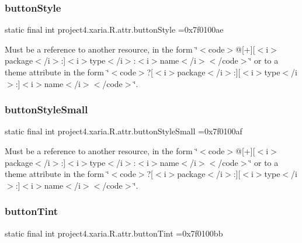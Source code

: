 \subsubsection{\texorpdfstring{button\+Style}{buttonStyle}}
{\footnotesize\ttfamily static final int project4.\+xaria.\+R.\+attr.\+button\+Style =0x7f0100ae\hspace{0.3cm}{\ttfamily [static]}}

Must be a reference to another resource, in the form \char`\"{}$<$code$>$@\mbox{[}+\mbox{]}\mbox{[}$<$i$>$package$<$/i$>$\+:\mbox{]}$<$i$>$type$<$/i$>$\+:$<$i$>$name$<$/i$>$$<$/code$>$\char`\"{} or to a theme attribute in the form \char`\"{}$<$code$>$?\mbox{[}$<$i$>$package$<$/i$>$\+:\mbox{]}\mbox{[}$<$i$>$type$<$/i$>$\+:\mbox{]}$<$i$>$name$<$/i$>$$<$/code$>$\char`\"{}. \mbox{\label{classproject4_1_1xaria_1_1R_1_1attr_a35225ac12d9f0125dce37d13b1e42530}} 
\subsubsection{\texorpdfstring{button\+Style\+Small}{buttonStyleSmall}}
{\footnotesize\ttfamily static final int project4.\+xaria.\+R.\+attr.\+button\+Style\+Small =0x7f0100af\hspace{0.3cm}{\ttfamily [static]}}

Must be a reference to another resource, in the form \char`\"{}$<$code$>$@\mbox{[}+\mbox{]}\mbox{[}$<$i$>$package$<$/i$>$\+:\mbox{]}$<$i$>$type$<$/i$>$\+:$<$i$>$name$<$/i$>$$<$/code$>$\char`\"{} or to a theme attribute in the form \char`\"{}$<$code$>$?\mbox{[}$<$i$>$package$<$/i$>$\+:\mbox{]}\mbox{[}$<$i$>$type$<$/i$>$\+:\mbox{]}$<$i$>$name$<$/i$>$$<$/code$>$\char`\"{}. \mbox{\label{classproject4_1_1xaria_1_1R_1_1attr_aeed96d7d83e1cae869cb36d92d2a8a0c}} 
\subsubsection{\texorpdfstring{button\+Tint}{buttonTint}}
{\footnotesize\ttfamily static final int project4.\+xaria.\+R.\+attr.\+button\+Tint =0x7f0100bb\hspace{0.3cm}{\ttfamily [static]}}

